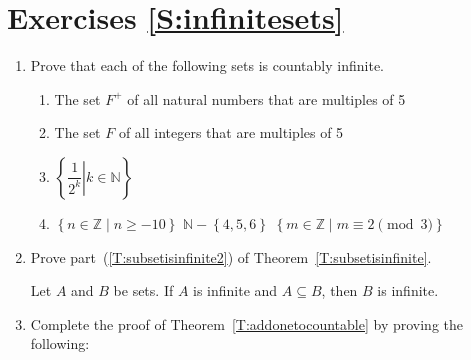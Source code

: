\section*{Exercises \ref{S:infinitesets}}

\begin{enumerate}
\xitem State whether each of the following is true or false.
\label{exer:sec93-1}%
\begin{enumerate}
\item If a set $A$ is countably infinite, then $A$ is infinite.
\item If a set $A$ is countably infinite, then $A$ is countable.
\item If a set $A$ is uncountable, then $A$ is not countably infinite.
\item If $A \approx \mathbb{N}_k$ for some $k \in \mathbb{N}$, then $A$ is not countable.
\end{enumerate}

\item Prove that each of the following sets is countably infinite.
\label{exer:sec93-2}%
\begin{enumerate}
\item The set $F^+$ of all natural numbers that are multiples of 5
\item The set $F$ of all integers that are multiples of 5
\end{enumerate}
\begin{multicols}{2}
\begin{enumerate} \setcounter{enumii}{2}
\item $\left\{ \left. \dfrac{1}{2^k} \right| k \in \mathbb{N} \right\}$
\item $\left\{ n \in \mathbb{Z} \mid n \geq -10 \right\}$
\yitem $\mathbb{N} - \left\{ 4, 5, 6 \right\}$
\yitem $\left\{ m \in \mathbb{Z} \mid m \equiv 2 \pmod 3 \right\}$
\end{enumerate}
\end{multicols}

\item Prove part~(\ref{T:subsetisinfinite2}) of Theorem~\ref{T:subsetisinfinite}. 
\label{exer:subsetisinfinite}%

Let $A$ and $B$ be sets.  If $A$ is infinite and $A \subseteq B$, then $B$ is infinite.



\item Complete the proof of Theorem~\ref{T:addonetocountable} by proving the following:
\label{exer:addonetocountable}%


\end{enumerate}

